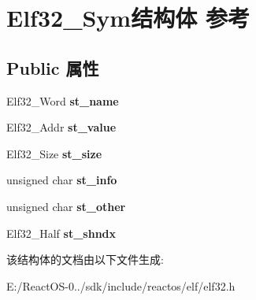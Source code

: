 \hypertarget{struct_elf32___sym}{}\section{Elf32\+\_\+\+Sym结构体 参考}
\label{struct_elf32___sym}
\subsection*{Public 属性}
\begin{DoxyCompactItemize}
\item 
\mbox{\label{struct_elf32___sym_a6a972b30868879f8a1e071e0c45e5031}} 
Elf32\+\_\+\+Word {\bfseries st\+\_\+name}
\item 
\mbox{\label{struct_elf32___sym_abf8ff76884bc5e2acb5f7eb42f733c2e}} 
Elf32\+\_\+\+Addr {\bfseries st\+\_\+value}
\item 
\mbox{\label{struct_elf32___sym_a631da893f4a7c8fa0ab830c80d911383}} 
Elf32\+\_\+\+Size {\bfseries st\+\_\+size}
\item 
\mbox{\label{struct_elf32___sym_a7d131c44ec48708b1c98f9b00ca9d528}} 
unsigned char {\bfseries st\+\_\+info}
\item 
\mbox{\label{struct_elf32___sym_a2e1bf6bedb5180f74ea8cbaf9cedfd36}} 
unsigned char {\bfseries st\+\_\+other}
\item 
\mbox{\label{struct_elf32___sym_a46e54847ab00fbea62df8ee5dff8dec6}} 
Elf32\+\_\+\+Half {\bfseries st\+\_\+shndx}
\end{DoxyCompactItemize}


该结构体的文档由以下文件生成\+:\begin{DoxyCompactItemize}
\item 
E\+:/\+React\+O\+S-\/0../sdk/include/reactos/elf/elf32.\+h\end{DoxyCompactItemize}
